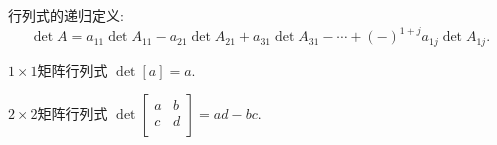 行列式的递归定义:
\begin{equation}
  \det A = a_{11} \det A_{11} - a_{21} \det A_{21} + a_{31} \det A_{31} - \cdots + \left( - \right) ^{1+j} a_{1j} \det A_{1j}. 
\end{equation}

\begin{example}
    $1 \times 1$矩阵行列式 $\det [a] = a$.

    $2 \times 2$矩阵行列式 $\det \begin{bmatrix}
     a & b\\
     c & d\\
    \end{bmatrix} = ad - bc.$
\end{example}